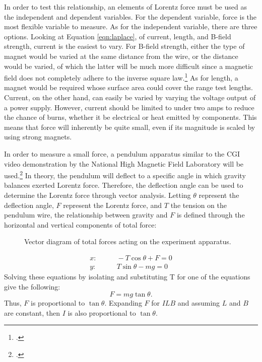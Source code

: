In order to test this relationship, an elements of Lorentz force must be used as the independent and dependent variables.
For the dependent variable, force is the most flexible variable to measure.
As for the independent variable, there are three options.
Looking at Equation \eqref{eqn:laplace}, of current, length, and B-field strength, current is the easiest to vary.
For B-field strength, either the type of magnet would be varied at the same distance from the wire, or the distance would be varied, of which the latter will be much more difficult since a magnetic field does not completely adhere to the inverse square law.\footcite{wwdistance}
As for length, a magnet would be required whose surface area could cover the range test lengths.
Current, on the other hand, can easily be varied by varying the voltage output of a power supply.
However, current should be limited to under two amps to reduce the chance of burns, whether it be electrical or heat emitted by components.
This means that force will inherently be quite small, even if its magnitude is scaled by using strong magnets.

In order to measure a small force, a pendulum apparatus similar to the CGI video demonstration by the National High Magnetic Field Laboratory will be used.\footcite{nmllorentz}
In theory, the pendulum will deflect to a specific angle in which gravity balances exerted Lorentz force.
Therefore, the deflection angle can be used to determine the Lorentz force through vector analysis.
Letting $\theta$ represent the deflection angle, $F$ represent the Lorentz force, and $T$ the tension on the pendulum wire, the relationship between gravity and $F$ is defined through the horizontal and vertical components of total force:
\begin{figure}[t!]
	\centering
	\caption{Vector diagram of total forces acting on the experiment apparatus.}
	\vspace{-1.5em}
	\label{fig:vector}
\end{figure}
\begin{align*}
	x:& \qquad -T \cos\theta + F =0 \\
	y:& \qquad T \sin\theta - mg =0
\end{align*}
Solving these equations by isolating and substituting T for one of the equations give the following:
\begin{equation}
	F = mg \tan\theta \text{.} \label{eqn:experiment}
\end{equation}
Thus, $F$ is proportional to $\tan\theta$. Expanding $F$ for $ILB$ and assuming $L$ and $B$ are constant, then $I$ is also proportional to $\tan\theta$.
